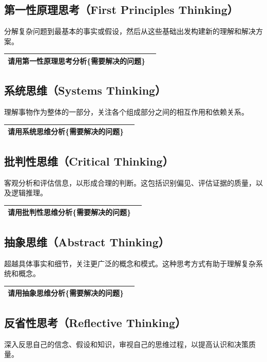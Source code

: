 \documentclass[12pt]{book}
\begin{document}
\subsection{第一性原理思考（First Principles Thinking）}
\bigskip
分解复杂问题到最基本的事实或假设，然后从这些基础出发构建新的理解和解决方案。

\begin{tabular}{|p{15cm}|p{3cm}|}
	\hline
	 请用第一性原理思考分析\{需要解决的问题\} \\
	\hline
\end{tabular}


\subsection{系统思维（Systems Thinking）}
\bigskip
  理解事物作为整体的一部分，关注各个组成部分之间的相互作用和依赖关系。

\begin{tabular}{|p{15cm}|p{3cm}|}
	\hline
	请用系统思维分析\{需要解决的问题\}\\
	\hline
\end{tabular}


\subsection{批判性思维（Critical Thinking）}
\bigskip
  客观分析和评估信息，以形成合理的判断。这包括识别偏见、评估证据的质量，以及逻辑推理。

\begin{tabular}{|p{15cm}|p{3cm}|}
	\hline
请用批判性思维分析\{需要解决的问题\}\\
	\hline
\end{tabular}

\subsection{抽象思维（Abstract Thinking）}
\bigskip
  超越具体事实和细节，关注更广泛的概念和模式。这种思考方式有助于理解复杂系统和概念。

\begin{tabular}{|p{15cm}|p{3cm}|}
	\hline
请用抽象思维分析\{需要解决的问题\}\\
	\hline
\end{tabular}

\subsection{反省性思考（Reflective Thinking）}
\bigskip
  深入反思自己的信念、假设和知识，审视自己的思维过程，以提高认识和决策质量。
\end{document}
